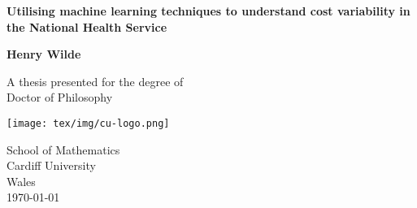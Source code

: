 \begin{titlepage}

    \begin{center}
        \vspace*{1cm}

        \Large
        \textbf{Utilising machine learning techniques to understand cost
        variability in the National Health Service}

        \vspace{2.5cm}
        \large
        \textbf{Henry Wilde}

        \vfill

        A thesis presented for the degree of\\
        Doctor of Philosophy

        \vspace{0.8cm}

        \texttt{[image: tex/img/cu-logo.png]}

        School of Mathematics\\
        Cardiff University\\
        Wales\\
        \today

    \end{center}
\end{titlepage}
